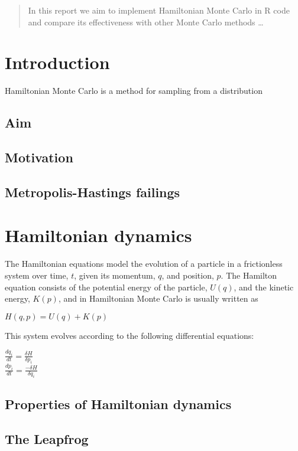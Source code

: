 \documentclass[12pt]{article}
\begin{document}
\maketitle

\begin{abstract}
In this report we aim to implement Hamiltonian Monte Carlo in R code and compare its effectiveness with other Monte Carlo methods \ldots
\end{abstract}

\section{Introduction}
Hamiltonian Monte Carlo is a method for sampling from a distribution 
\subsection{Aim}
\subsection{Motivation}
\subsection{Metropolis-Hastings failings}

\section{Hamiltonian dynamics}
The Hamiltonian equations model the evolution of a particle in a frictionless system over time, $t$, given its momentum, $q$, and position, $p$. The Hamilton equation consists of the potential energy of the particle, $U(q)$, and the kinetic energy, $K(p)$, and in Hamiltonian Monte Carlo is usually written as
\begin{center}$H(q,p) = U(q) + K(p)$ \\ \end{center}
This system evolves according to the following differential equations:
\begin{center}
$\frac{dq_{i}}{dt} = \frac{\delta H}{\delta p_{i}}$ \\
$\frac{dp_{i}}{dt} = \frac{-\delta H}{\delta q_{i}}$
\end{center}
\subsection{Properties of Hamiltonian dynamics}
\subsection{The Leapfrog}
\end{document}
